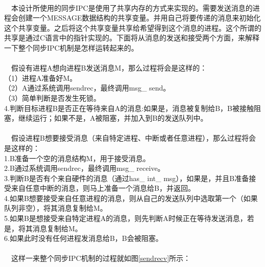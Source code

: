 \documentclass[UTF8,nofonts,cs4size]{ctexrep}
\begin{document}
\paragraph{}
\indent \ \ 
本设计所使用的同步IPC是使用了共享内存的方式来实现的。需要发送消息的进程会创建一个MESSAGE数据结构的共享变量。并用自己将要传递的消息来初始化这个共享变量。之后将这个共享变量共享给希望得到这个消息的进程。这个所谓的共享是通过C语言中的指针实现的。下面将从消息的发送和接受两个方面，来解释一下整个同步IPC机制是怎样运转起来的。
\paragraph{}
\indent \ \ 假设有进程A想向进程B发送消息M，那么过程将会是这样的：
\\ \indent （1）进程A准备好M。
\\ \indent （2）A通过系统调用sendrec，最终调用msg\_ send。
\\ \indent （3）简单判断是否发生死锁。
\\ \indent 4.判断目标进程B是否正在等待来自A的消息:如果是，消息被复制给B，B被接触阻塞，继续运行；如果不是，A被阻塞，并加入到B的发送队列中。
\paragraph{}
\indent \ \ 假设进程B想要接受消息（来自特定进程、中断或者任意进程），那么过程将会是这样的：
\\ \indent 1.B准备一个空的消息结构M，用于接受消息。
\\ \indent 2.B通过系统调用sendrec，最终调用msg\_ receive。
\\ \indent 3.判断B是否有个来自硬件的消息（通过has\_ int\_ msg），如果是，并且B准备接受来自任意中断的消息，则马上准备一个消息给B，并返回。
\\ \indent 4.如果B想要接受来自任意进程的消息，则从自己的发送队列中选取第一个（如果队列非空），将其消息复制给M。
\\ \indent 5.如果B是想接受来自特定进程A的消息，则先判断A时候正在等待发送消息，若是，将其消息复制给M。
\\ \indent 6.如果此时没有任何进程发消息给B，B会被阻塞。
\paragraph{}
\indent \ \ 这样一来整个同步IPC机制的过程就如图\ref{sendrecv}所示：
\end{document}
